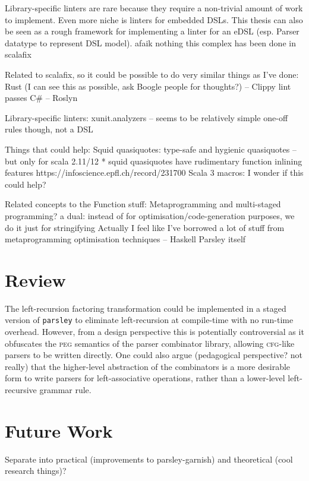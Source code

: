 \documentclass[../../main.tex]{subfiles}
\begin{document}
Library-specific linters are rare because they require a non-trivial amount of work to implement.
Even more niche is linters for embedded DSLs.
This thesis can also be seen as a rough framework for implementing a linter for an eDSL (esp. Parser datatype to represent DSL model).
afaik nothing this complex has been done in scalafix

Related to scalafix, so it could be possible to do very similar things as I've done:
Rust (I can see this as possible, ask Boogle people for thoughts?) -- Clippy lint passes %
C\# -- Roslyn

Library-specific linters:
xunit.analyzers -- seems to be relatively simple one-off rules though, not a DSL

Things that could help:
Squid quasiquotes: type-safe and hygienic quasiquotes -- but only for scala 2.11/12
* squid quasiquotes have rudimentary function inlining features https://infoscience.epfl.ch/record/231700
Scala 3 macros: I wonder if this could help?

Related concepts to the Function stuff:
Metaprogramming and multi-staged programming? a dual: instead of for optimisation/code-generation purposes, we do it just for stringifying
Actually I feel like I've borrowed a lot of stuff from metaprogramming optimisation techniques -- Haskell Parsley itself


\section{Review}
The left-recursion factoring transformation could be implemented in a staged version of \texttt{parsley} to eliminate left-recursion at compile-time with no run-time overhead.
However, from a design perspective this is potentially controversial as it obfuscates the \textsc{peg} semantics of the parser combinator library, allowing \textsc{cfg}-like parsers to be written directly.
One could also argue (pedagogical perspective? not really) that the higher-level abstraction of the  combinators is a more desirable form to write parsers for left-associative operations, rather than a lower-level left-recursive grammar rule.

\section{Future Work}
Separate into practical (improvements to parsley-garnish) and theoretical (cool research things)?
\end{document}
